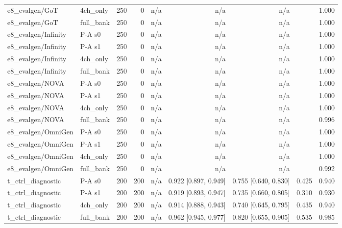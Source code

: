 \begin{table}[htbp]
\begin{tabular}{llrrrrrrr}
e8\_evalgen/GoT & 4ch\_only & 250 & 0 & n/a & n/a & n/a &  & 1.000 \\
e8\_evalgen/GoT & full\_bank & 250 & 0 & n/a & n/a & n/a &  & 1.000 \\
e8\_evalgen/Infinity & P-A s0 & 250 & 0 & n/a & n/a & n/a &  & 1.000 \\
e8\_evalgen/Infinity & P-A s1 & 250 & 0 & n/a & n/a & n/a &  & 1.000 \\
e8\_evalgen/Infinity & 4ch\_only & 250 & 0 & n/a & n/a & n/a &  & 1.000 \\
e8\_evalgen/Infinity & full\_bank & 250 & 0 & n/a & n/a & n/a &  & 1.000 \\
e8\_evalgen/NOVA & P-A s0 & 250 & 0 & n/a & n/a & n/a &  & 1.000 \\
e8\_evalgen/NOVA & P-A s1 & 250 & 0 & n/a & n/a & n/a &  & 1.000 \\
e8\_evalgen/NOVA & 4ch\_only & 250 & 0 & n/a & n/a & n/a &  & 1.000 \\
e8\_evalgen/NOVA & full\_bank & 250 & 0 & n/a & n/a & n/a &  & 0.996 \\
e8\_evalgen/OmniGen & P-A s0 & 250 & 0 & n/a & n/a & n/a &  & 1.000 \\
e8\_evalgen/OmniGen & P-A s1 & 250 & 0 & n/a & n/a & n/a &  & 1.000 \\
e8\_evalgen/OmniGen & 4ch\_only & 250 & 0 & n/a & n/a & n/a &  & 1.000 \\
e8\_evalgen/OmniGen & full\_bank & 250 & 0 & n/a & n/a & n/a &  & 0.992 \\
t\_ctrl\_diagnostic & P-A s0 & 200 & 200 & n/a & 0.922 [0.897, 0.949] & 0.755 [0.640, 0.830] & 0.425 & 0.940 \\
t\_ctrl\_diagnostic & P-A s1 & 200 & 200 & n/a & 0.919 [0.893, 0.947] & 0.735 [0.660, 0.805] & 0.310 & 0.930 \\
t\_ctrl\_diagnostic & 4ch\_only & 200 & 200 & n/a & 0.914 [0.888, 0.943] & 0.740 [0.645, 0.795] & 0.435 & 0.940 \\
t\_ctrl\_diagnostic & full\_bank & 200 & 200 & n/a & 0.962 [0.945, 0.977] & 0.820 [0.655, 0.905] & 0.535 & 0.985 \\
\bottomrule
\end{tabular}
\end{table}
